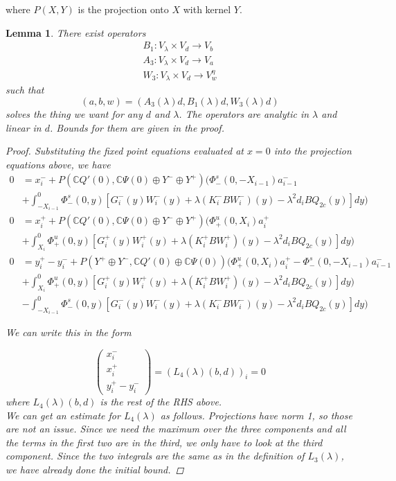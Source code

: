 \documentclass[12pt]{article}
\def\C{{\mathbb C}}
\newtheorem{lemma}{Lemma}
\begin{document}
where $P(X,Y)$ is the projection onto $X$ with kernel $Y$.

\begin{lemma}
There exist operators 
\begin{align*}
B_1: V_\lambda \times V_d \rightarrow V_b \\
A_3: V_\lambda \times V_d \rightarrow V_a \\
W_3: V_\lambda \times V_d \rightarrow V_w^\eta
\end{align*}
such that 
\[
(a,b,w) = (A_3(\lambda)d, B_1(\lambda)d, W_3(\lambda)d)
\]
solves the thing we want for any $d$ and $\lambda$. The operators are analytic in $\lambda$ and linear in $d$. Bounds for them are given in the proof.

\begin{proof}
Substituting the fixed point equations evaluated at $x = 0$ into the projection equations above, we have 
\begin{align*}
0 &= x_i^- + P(\C Q'(0), \C\Psi(0) \oplus Y^- \oplus Y^+) \Big( \Phi^s_-(0, -X_{i-1})a^-_{i-1}  \\
&+ \int_{-X_{i-1}}^0 \Phi^s_-(0, y)[G_i^-(y) W_i^-(y) + \lambda (K_i^-B W_i^-)(y) - \lambda^2 d_i B Q_{2c}(y) ] dy \Big) \\
0 &= x_i^+ + P(\C Q'(0), \C\Psi(0) \oplus Y^- \oplus Y^+) \Big( \Phi^u_+(0, X_i)a^+_{i} \\
&+ \int_{X_{i}}^0 \Phi^u_+(0, y)[G_i^+(y) W_i^+(y) + \lambda (K_i^+ B W_i^+)(y) - \lambda^2 d_i B Q_{2c}(y) ] dy \Big)\\
0 &= y_i^+ - y_i^- + P(Y^+ \oplus Y^-, \C Q'(0) \oplus \C\Psi(0) )\Big( \Phi^u_+(0, X_i)a^+_{i} - \Phi^s_-(0, -X_{i-1})a^-_{i-1} \\
&+ \int_{X_{i}}^0 \Phi^u_+(0, y)[G_i^+(y) W_i^+(y) + \lambda (K_i^+ B W_i^+)(y) - \lambda^2 d_i B Q_{2c}(y) ] dy \Big)\\
&- \int_{-X_{i-1}}^0 \Phi^s_-(0, y)[G_i^-(y) W_i^-(y) + \lambda (K_i^-B W_i^-)(y) - \lambda^2 d_i B Q_{2c}(y) ] dy \Big)
\end{align*}

We can write this in the form

\[ 
\begin{pmatrix}x_i^- \\ x_i^+ \\ y_i^+ - y_i^- \end{pmatrix} = (L_4(\lambda)(b,d))_i = 0
\]
where $L_4(\lambda)(b,d)$ is the rest of the RHS above.\\

We can get an estimate for $L_4(\lambda)$ as follows. Projections have norm 1, so those are not an issue. Since we need the maximum over the three components and all the terms in the first two are in the third, we only have to look at the third component. Since the two integrals are the same as in the definition of $L_3(\lambda)$, we have already done the initial bound.


\end{proof}
\end{lemma}
\end{document}
